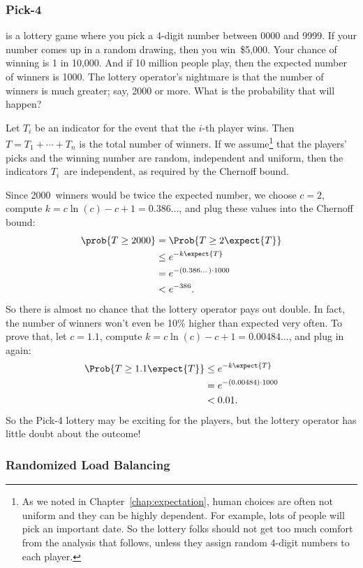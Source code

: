 \subsubsection{Pick-4}

 is a lottery game where you pick a 4-digit number between
0000 and 9999.  If your number comes up in a random drawing, then you
win~\$5,000.  Your chance of winning is 1 in 10,000.  And if 10
million people play, then the expected number of winners is 1000.  The
lottery operator's nightmare is that the number of winners is much
greater; say, 2000 or more.  What is the probability that will happen?

Let $T_i$ be an indicator for the event that the $i$-th player wins.
Then $T = T_1 + \cdots + T_n$ is the total number of winners.  If we
assume\footnote{As we noted in Chapter~\ref{chap:expectation}, human
  choices are often not uniform and they can be highly dependent.  For
  example, lots of people will pick an important date.  So the lottery
  folks should not get too much comfort from the analysis that
  follows, unless they assign random 4-digit numbers to each player.}
that the players' picks and the winning number are random, independent
and uniform, then the indicators $T_i$~are independent, as required by
the Chernoff bound.


Since 2000~winners would be twice the expected number, we choose $c =
2$, compute $k = c \ln(c) - c + 1 = 0.386\dots$, and plug these values
into the Chernoff bound:
\begin{align*}
\prob{T \geq 2000} & = \Prob{T \geq 2 \expect{T}} \\
  & \leq e^{-k \expect{T}} \\
  & = e^{- (0.386\dots) \cdot 1000} \\
  & < e^{-386}.
\end{align*}
So there is almost no chance that the lottery operator pays out
double.  In fact, the number of winners won't even be 10\% higher than
expected very often.  To prove that, let $c = 1.1$, compute $k = c
\ln(c) - c + 1 = 0.00484\dots$, and plug in again:
\begin{align*}
\Prob{T \geq 1.1 \expect{T}} & \leq e^{-k \expect{T}} \\
  & = e^{- (0.00484)\cdot 1000} \\
  & < 0.01.
\end{align*}
So the Pick-4 lottery may be exciting for the players, but the lottery
operator has little doubt about the outcome!

\subsubsection{Randomized Load Balancing}

